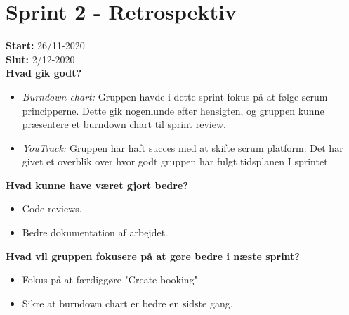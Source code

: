 \chapter{Sprint 2 - Retrospektiv}\label{app:sprint2}
\textbf{Start:} 26/11-2020 \\
\textbf{Slut:} 2/12-2020 \\

\textbf{Hvad gik godt?}
\begin{itemize}
    \item \textit{Burndown chart:} Gruppen havde i dette sprint fokus på at følge scrum-principperne. Dette gik nogenlunde efter hensigten, 
    og gruppen kunne præsentere et burndown chart til sprint review. 
    \item \textit{YouTrack:} Gruppen har haft succes med at skifte scrum platform. Det har givet et overblik over hvor godt gruppen har fulgt tidsplanen I sprintet.  
\end{itemize}

\textbf{Hvad kunne have været gjort bedre?}
\begin{itemize}
    \item Code reviews.  
    \item Bedre dokumentation af arbejdet.
\end{itemize}

\textbf{Hvad vil gruppen fokusere på at gøre bedre i næste sprint?}
\begin{itemize}
    \item Fokus på at færdiggøre "Create booking"
    \item Sikre at burndown chart er bedre en sidste gang.
\end{itemize}